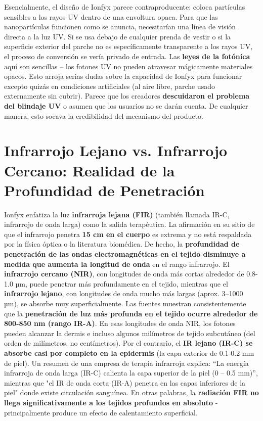 \documentclass{article}
\begin{document}
Esencialmente, el diseño de Ionfyx parece contraproducente: coloca partículas sensibles a los rayos UV dentro de una envoltura opaca. Para que las nanopartículas funcionen como se anuncia, necesitarían una línea de visión directa a la luz UV. Si se usa debajo de cualquier prenda de vestir o si la superficie exterior del parche no es específicamente transparente a los rayos UV, el proceso de conversión se vería privado de entrada. Las \textbf{leyes de la fotónica} aquí son sencillas – los fotones UV no pueden atravesar mágicamente materiales opacos. Esto arroja serias dudas sobre la capacidad de Ionfyx para funcionar excepto quizás en condiciones artificiales (al aire libre, parche usado externamente sin cubrir). Parece que los creadores \textbf{descuidaron el problema del blindaje UV} o asumen que los usuarios no se darán cuenta. De cualquier manera, esto socava la credibilidad del mecanismo del producto.

\section{Infrarrojo Lejano vs. Infrarrojo Cercano: Realidad de la Profundidad de Penetración}

Ionfyx enfatiza la luz \textbf{infrarroja lejana (FIR)} (también llamada IR-C, infrarrojo de onda larga) como la salida terapéutica. La afirmación en su sitio de que el infrarrojo penetra \textbf{15 cm en el cuerpo} es extrema y no está respaldada por la física óptica o la literatura biomédica. De hecho, la \textbf{profundidad de penetración de las ondas electromagnéticas en el tejido disminuye a medida que aumenta la longitud de onda} en el rango infrarrojo. El \textbf{infrarrojo cercano (NIR)}, con longitudes de onda más cortas alrededor de 0.8-1.0 µm, puede penetrar más profundamente en el tejido, mientras que el \textbf{infrarrojo lejano}, con longitudes de onda mucho más largas (aprox. 3–1000 µm), se absorbe muy superficialmente. Las fuentes muestran consistentemente que la \textbf{penetración de luz más profunda en el tejido ocurre alrededor de 800-850 nm (rango IR-A)}. En esas longitudes de onda NIR, los fotones pueden alcanzar la dermis e incluso algunos milímetros de tejido subcutáneo (del orden de milímetros, no centímetros). Por el contrario, el \textbf{IR lejano (IR-C) se absorbe casi por completo en la epidermis} (la capa exterior de 0.1-0.2 mm de piel). Un resumen de una empresa de terapia infrarroja explica: “La energía infrarroja de onda larga (IR-C) calienta la capa superior de la piel (0 – 0.5 mm)”, mientras que "el IR de onda corta (IR-A) penetra en las capas inferiores de la piel" donde existe circulación sanguínea. En otras palabras, la \textbf{radiación FIR no llega significativamente a los tejidos profundos en absoluto} - principalmente produce un efecto de calentamiento superficial.
\end{document}
